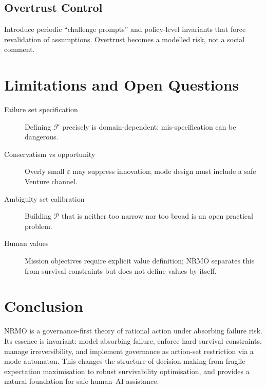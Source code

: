 \subsection{Overtrust Control}
\label{sec:foundations-10-2-overtrust-control}

Introduce periodic ``challenge prompts'' and policy-level invariants
that force revalidation of assumptions. Overtrust becomes a modelled
risk, not a social comment.

\section{Limitations and Open Questions}
\label{sec:foundations-11-limitations}

\begin{description}
\item[Failure set specification] Defining $\mathcal{F}$ precisely is
domain-dependent; mis-specification can be dangerous.
\item[Conservatism vs opportunity] Overly small $\varepsilon$ may
suppress innovation; mode design must include a safe Venture channel.
\item[Ambiguity set calibration] Building $\mathcal{P}$ that is
neither too narrow nor too broad is an open practical problem.
\item[Human values] Mission objectives require explicit value
definition; NRMO separates this from survival constraints but does
not define values by itself.
\end{description}

\section{Conclusion}
\label{sec:foundations-12-conclusion}

NRMO is a governance-first theory of rational action under
absorbing failure risk. Its essence is invariant: model absorbing
failure, enforce hard survival constraints, manage irreversibility,
and implement governance as action-set restriction via a mode
automaton. This changes the structure of decision-making from
fragile expectation maximisation to robust survivability
optimisation, and provides a natural foundation for safe human--AI
assistance.

